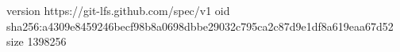 version https://git-lfs.github.com/spec/v1
oid sha256:a4309e8459246becf98b8a0698dbbe29032c795ca2c87d9e1df8a619eaa67d52
size 1398256

